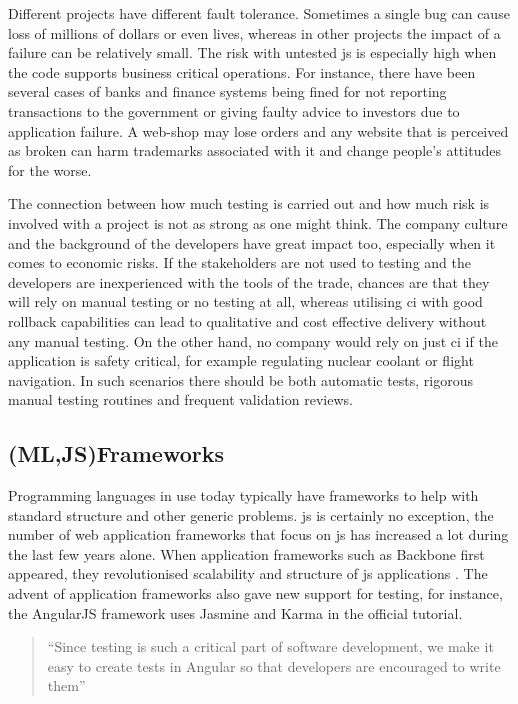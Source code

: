\documentclass[11pt]{article}
\begin{document}
Different projects have different fault tolerance. Sometimes a single bug can cause loss of millions of dollars or even lives, whereas in other projects the impact of a failure can be relatively small. The risk with untested \gls{js} is especially high when the code supports business critical operations. For instance, there have been several cases of banks and finance systems being fined for not reporting transactions to the government \cite{Bug1} or giving faulty advice to investors \cite{Bug2} due to application failure. A web-shop may lose orders and any website that is perceived as broken can harm trademarks associated with it and change people's attitudes for the worse.

The connection between how much testing is carried out and how much risk is involved with a project is not as strong as one might think. The company culture and the background of the developers have great impact too, especially when it comes to economic risks. If the stakeholders are not used to testing and the developers are inexperienced with the tools of the trade, chances are that they will rely on manual testing or no testing at all, whereas utilising \gls{ci} with good rollback capabilities can lead to qualitative and cost effective delivery without any manual testing. On the other hand, no company would rely on just \gls{ci} if the application is safety critical, for example regulating nuclear coolant or flight navigation. In such scenarios there should be both automatic tests, rigorous manual testing routines and frequent validation reviews. \cite[questions~14,~38]{Ahnve}

\subsection{(ML,JS)Frameworks}
\label{subsec:frameworks}

Programming languages in use today typically have frameworks to help with standard structure and other generic problems. \gls{js} is certainly no exception, the number of web application frameworks that focus on \gls{js} has increased a lot during the last few years alone. When application frameworks such as Backbone first appeared, they revolutionised scalability and structure of \gls{js} applications \cite[question~23]{Ahnve}\cite[question~11]{Rovegard}. The advent of application frameworks also gave new support for testing, for instance, the AngularJS framework uses Jasmine and Karma in the official tutorial.

\begin{quote}
``Since testing is such a critical part of software development, we make it easy to create tests in Angular so that developers are encouraged to write them'' \cite{AngularTemplates}
\end{quote}
\end{document}
